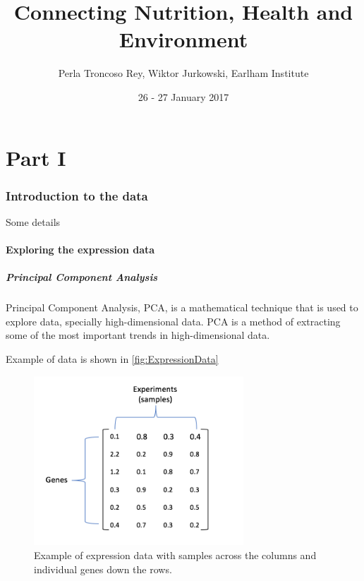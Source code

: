 \documentclass[11pt, oneside]{article}   	%
\title{Connecting Nutrition, Health and Environment }
\author{Perla Troncoso Rey, Wiktor Jurkowski, Earlham Institute}
\date{26 - 27 January 2017}	 %
\begin{document}
\maketitle

\tableofcontents

\listoffigures
\listoftables


\part{Part I}

\section{Introduction to the data}

Some details

\subsection{Exploring the expression data}



\subsubsection{Principal Component Analysis}

Principal Component Analysis, PCA, is a mathematical technique that is used to explore data, specially high-dimensional data. PCA is a method of extracting some of the most important trends in high-dimensional data.

Example of data is shown in \autoref{fig:ExpressionData}

\begin{figure}[!h]
	\centering
	\includegraphics[width=0.7\textwidth]{example_expression_data}
	\caption{Example of expression data with samples across the columns and individual genes down the rows.}
	\label{fig:ExpressionData}
\end{figure}
\end{document}
